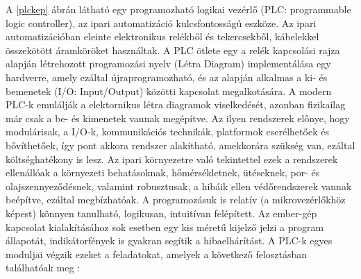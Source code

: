 A \ref{plckep} ábrán látható egy programozható logikai vezérlő (PLC: programmable logic controller), az ipari automatizáció kulcsfontosságú eszköze. Az ipari automatizációban eleinte elektronikus relékből és tekercsekből, kábelekkel összekötött áramköröket használtak. A PLC ötlete egy a relék kapcsolási rajza alapján létrehozott programozási nyelv (Létra Diagram) implementálása egy hardverre, amely ezáltal újraprogramozható, és az alapján alkalmas a ki- és bemenetek (I/O: Input/Output) közötti kapcsolat megalkotására. A modern PLC-k emulálják a elektornikus létra diagramok viselkedését, azonban fizikailag már csak a be- és kimenetek vannak megépítve. Az ilyen rendszerek előnye, hogy modulárisak, a I/O-k, kommunikációs technikák, platformok cserélhetőek és bővíthetőek, így pont akkora rendszer alakítható, amekkorára szükség van, ezáltal költséghatékony is lesz. Az ipari környezetre való tekintettel ezek a rendszerek ellenállóak a környezeti behatásoknak, hőmérsékletnek, ütéseknek, por- és olajszennyeződésnek, valamint robusztusak, a hibáik ellen védőrendszerek vannak beépítve, ezáltal megbízhatóak. A programozásuk is relatív (a mikrovezérlőkhöz képest) könnyen tanulható, logikusan, intuitívan felépített. Az ember-gép kapcsolat kialakításához sok esetben egy kis méretű kijelző jelzi a program állapotát, indikátorfények is gyakran segítik a hibaelhárítást. A PLC-k egyes moduljai végzik ezeket a feladatokat, amelyek a következő felosztásban találhatóak meg \cite{Alphonsus2016}:
